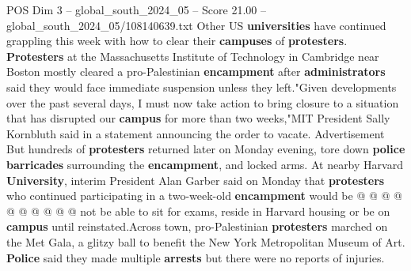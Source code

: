 \begin{textsample}{POS Dim 3 – global\_south\_2024\_05 – Score 21.00 – global\_south\_2024\_05/108140639.txt}
Other US \textbf{universities} have continued grappling this week with how to clear their \textbf{campuses} of \textbf{protesters}. \textbf{Protesters} at the Massachusetts Institute of Technology in Cambridge near Boston mostly cleared a pro-Palestinian \textbf{encampment} after \textbf{administrators} said they would face immediate suspension unless they left."Given developments over the past several days, I must now take action to bring closure to a situation that has disrupted our \textbf{campus} for more than two weeks,"MIT President Sally Kornbluth said in a statement announcing the order to vacate.
Advertisement But hundreds of \textbf{protesters} returned later on Monday evening, tore down \textbf{police} \textbf{barricades} surrounding the \textbf{encampment}, and locked arms.
At nearby Harvard \textbf{University}, interim President Alan Garber said on Monday that \textbf{protesters} who continued participating in a two-week-old \textbf{encampment} would be @ @ @ @ @ @ @ @ @ @ not be able to sit for exams, reside in Harvard housing or be on \textbf{campus} until reinstated.Across town, pro-Palestinian \textbf{protesters} marched on the Met Gala, a glitzy ball to benefit the New York Metropolitan Museum of Art. \textbf{Police} said they made multiple \textbf{arrests} but there were no reports of injuries.

\end{textsample}

